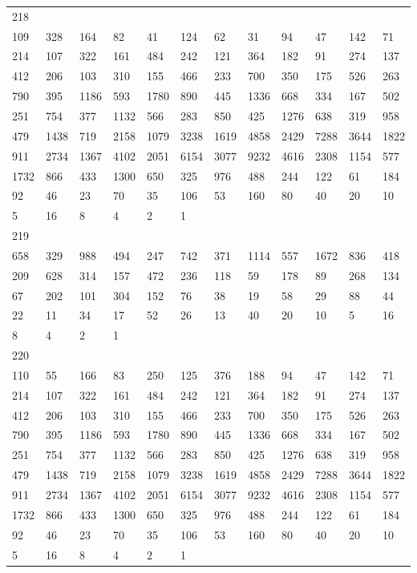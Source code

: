 \begin{longtable}{llllllllllll}
218&&&&&&&&&&&\\
109& 328& 164& 82& 41& 124& 62& 31& 94& 47& 142& 71\\
214& 107& 322& 161& 484& 242& 121& 364& 182& 91& 274& 137\\
412& 206& 103& 310& 155& 466& 233& 700& 350& 175& 526& 263\\
790& 395& 1186& 593& 1780& 890& 445& 1336& 668& 334& 167& 502\\
251& 754& 377& 1132& 566& 283& 850& 425& 1276& 638& 319& 958\\
479& 1438& 719& 2158& 1079& 3238& 1619& 4858& 2429& 7288& 3644& 1822\\
911& 2734& 1367& 4102& 2051& 6154& 3077& 9232& 4616& 2308& 1154& 577\\
1732& 866& 433& 1300& 650& 325& 976& 488& 244& 122& 61& 184\\
92& 46& 23& 70& 35& 106& 53& 160& 80& 40& 20& 10\\
5& 16& 8& 4& 2& 1& \\

219&&&&&&&&&&&\\
658& 329& 988& 494& 247& 742& 371& 1114& 557& 1672& 836& 418\\
209& 628& 314& 157& 472& 236& 118& 59& 178& 89& 268& 134\\
67& 202& 101& 304& 152& 76& 38& 19& 58& 29& 88& 44\\
22& 11& 34& 17& 52& 26& 13& 40& 20& 10& 5& 16\\
8& 4& 2& 1& \\

220&&&&&&&&&&&\\
110& 55& 166& 83& 250& 125& 376& 188& 94& 47& 142& 71\\
214& 107& 322& 161& 484& 242& 121& 364& 182& 91& 274& 137\\
412& 206& 103& 310& 155& 466& 233& 700& 350& 175& 526& 263\\
790& 395& 1186& 593& 1780& 890& 445& 1336& 668& 334& 167& 502\\
251& 754& 377& 1132& 566& 283& 850& 425& 1276& 638& 319& 958\\
479& 1438& 719& 2158& 1079& 3238& 1619& 4858& 2429& 7288& 3644& 1822\\
911& 2734& 1367& 4102& 2051& 6154& 3077& 9232& 4616& 2308& 1154& 577\\
1732& 866& 433& 1300& 650& 325& 976& 488& 244& 122& 61& 184\\
92& 46& 23& 70& 35& 106& 53& 160& 80& 40& 20& 10\\
5& 16& 8& 4& 2& 1& \\


\end{longtable}
